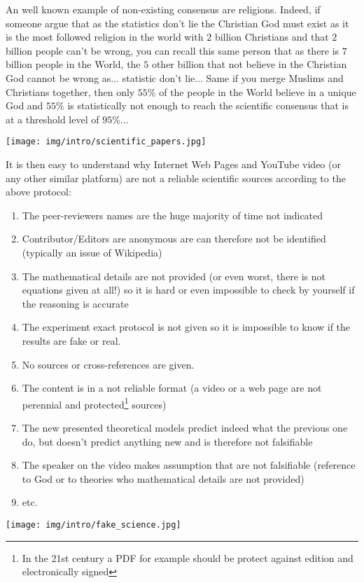 	An well known example of non-existing consensus are religions. Indeed, if someone argue that as the statistics don't lie the Christian God must exist as it is the most followed religion in the world with $2$ billion Christians and that $2$ billion people can't be wrong, you can recall this same person that as there is $7$ billion people in the World, the $5$ other billion that not believe in the Christian God cannot be wrong as... statistic don't lie... Same if you merge Muslims and Christians together, then only $55\%$ of the people in the World believe in a unique God and $55\%$ is statistically not enough to reach the scientific consensus that is at a threshold level of $95\%$...
	\begin{center}
		\texttt{[image: img/intro/scientific\_papers.jpg]}
	\end{center}
	It is then easy to understand why Internet Web Pages and YouTube video (or any other similar platform) are not a reliable scientific sources according to the above protocol:
	\begin{enumerate}
	   \item The peer-reviewers names are the huge majority of time not indicated
	   \item Contributor/Editors are anonymous are can therefore not be identified (typically an issue of Wikipedia)
	   \item The mathematical details are not provided (or even worst, there is not equations given at all!) so it is hard or even impossible to check by yourself if the reasoning is accurate
	   \item The experiment exact protocol is not given so it is impossible to know if the results are fake or real.
	   \item No sources or cross-references are given.
	   \item The content is in a not reliable format (a video or a web page are not perennial and protected\footnote{In the 21st century a PDF for example should be protect against edition and electronically signed} sources)
	   \item The new presented theoretical models predict indeed what the previous one do, but doesn't predict anything new and is therefore not falsifiable
	   \item The speaker on the video makes assumption that are not falsifiable (reference to God or to theories who mathematical details are not provided)
	   \item etc.
	\end{enumerate}
	\begin{center}
		\texttt{[image: img/intro/fake\_science.jpg]}
	\end{center}

